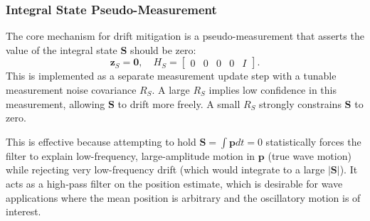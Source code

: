 \documentclass[11pt]{article}
\begin{document}
\subsubsection{Integral State Pseudo-Measurement}
\label{sssec:pseudomeas}
The core mechanism for drift mitigation is a pseudo-measurement that asserts the value of the integral state $\bm{S}$ should be zero:
\begin{equation}
\bm{z}_S = \bm{0}, \quad H_S = \begin{bmatrix} 0 & 0 & 0 & 0 & I \end{bmatrix}.
\end{equation}
This is implemented as a separate measurement update step with a tunable measurement noise covariance $R_S$. A large $R_S$ implies low confidence in this measurement, allowing $\bm{S}$ to drift more freely. A small $R_S$ strongly constrains $\bm{S}$ to zero.

This is effective because attempting to hold $\bm{S} = \int \bm{p}  dt = 0$ statistically forces the filter to explain low-frequency, large-amplitude motion in $\bm{p}$ (true wave motion) while rejecting very low-frequency drift (which would integrate to a large $|\bm{S}|$). It acts as a high-pass filter on the position estimate, which is desirable for wave applications where the mean position is arbitrary and the oscillatory motion is of interest.
\end{document}
